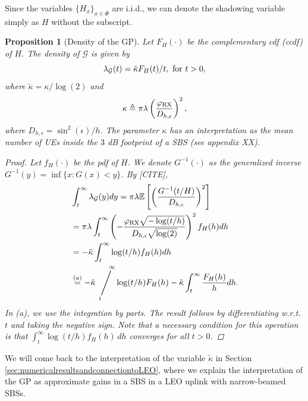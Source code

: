 \documentclass[lettersize,journal]{IEEEtran}
\newcommand{\viiva}{\mathop{\Bigg/}}
\newcommand{\sij}[3]{\viiva\limits_{\hspace*{-5mm}{#1}}^{\hspace*{5mm}{#2}}{#3}}
\newtheorem{prop}[theorem]{Proposition}
\begin{document}
Since the variables $\{H_x\}_{x \in \Phi}$ are i.i.d., we can denote the shadowing variable simply as $H$ without the subscript.


\begin{prop}[Density of the GP]
  Let $F_H(\cdot)$ be the complementary cdf (ccdf) of $H$. The density of $\mathcal{G}$ is given by
  \begin{equation}
    \label{eq:GPdensity}
    \lambda_{\mathcal{G}}(t)= \tilde{\kappa}F_H(t)/t, \text{ \text{for} }t>0,
  \end{equation}
  where $\tilde{\kappa}= \kappa/\log(2)$ and
  \begin{equation}
    \label{eq:kappa}
          {\kappa} \triangleq    \pi \lambda   \left(\frac{\varphi_{\textup{RX}}}{D_{h,\epsilon}}\right)^2,
  \end{equation}
  where $D_{h,\epsilon}=\sin^2(\epsilon)/h$. The parameter $\kappa$ has an interpretation as the mean number of UEs inside the $3$ dB footprint of a SBS (see appendix XX).
  \begin{proof}
    Let $f_H(\cdot)$ be the pdf of $H$. We denote $G^{-1}(\cdot)$ as the generalized inverse $G^{-1}(y) = \inf \{x:G(x)<y\}$. By [CITE],
    \begin{align*}
      &\int_t^{\infty}\lambda_{\mathcal{G}}(y)dy \overset{}{=} \pi \lambda \mathbb{E}\left[ \left(\frac{G^{-1}(t/H)}{D_{h,\epsilon}}\right)^2 \right] \\
      &=\pi \lambda \int_t^{\infty} \left(-\frac{\varphi_{\text{RX}}\sqrt{-\log(t/h)}}{D_{h,\epsilon} \sqrt{\log(2)}}\right)^2f_H(h) dh  \\
      &= -\tilde{\kappa} \int_t^{\infty} \log(t/h)f_H(h) dh\\
      &\overset{(a)}{=} -\tilde{\kappa} \sij{t}{\infty} \log(t/h)F_H(h) - \tilde{\kappa} \int_t^{\infty}\frac{F_H(h)}{h} dh.
    \end{align*}
    In (a), we use the integration by parts. The result follows by differentiating w.r.t. $t$ and taking the negative sign. Note that a necessary condition for this operation is that $\int_t^{\infty} \log(t/h)f_H(h) \, dh$ converges for all $t > 0$.

  \end{proof}
\end{prop}

We will come back to the interpretation of the variable $\tilde{\kappa}$ in Section \ref{sec:numericalresultsandconnectiontoLEO}, where we explain the interpretation of the GP as approximate gains in a SBS in a LEO uplink with narrow-beamed SBSs.
\end{document}

